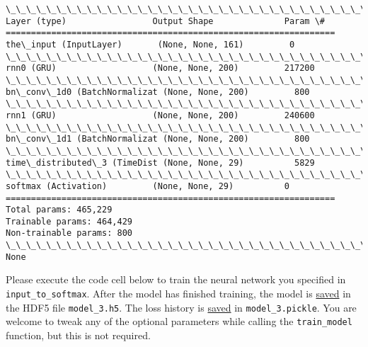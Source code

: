 \documentclass[11pt]{article}
\begin{document}
    \begin{Verbatim}[commandchars=\\\{\}]
\_\_\_\_\_\_\_\_\_\_\_\_\_\_\_\_\_\_\_\_\_\_\_\_\_\_\_\_\_\_\_\_\_\_\_\_\_\_\_\_\_\_\_\_\_\_\_\_\_\_\_\_\_\_\_\_\_\_\_\_\_\_\_\_\_
Layer (type)                 Output Shape              Param \#   
=================================================================
the\_input (InputLayer)       (None, None, 161)         0         
\_\_\_\_\_\_\_\_\_\_\_\_\_\_\_\_\_\_\_\_\_\_\_\_\_\_\_\_\_\_\_\_\_\_\_\_\_\_\_\_\_\_\_\_\_\_\_\_\_\_\_\_\_\_\_\_\_\_\_\_\_\_\_\_\_
rnn0 (GRU)                   (None, None, 200)         217200    
\_\_\_\_\_\_\_\_\_\_\_\_\_\_\_\_\_\_\_\_\_\_\_\_\_\_\_\_\_\_\_\_\_\_\_\_\_\_\_\_\_\_\_\_\_\_\_\_\_\_\_\_\_\_\_\_\_\_\_\_\_\_\_\_\_
bn\_conv\_1d0 (BatchNormalizat (None, None, 200)         800       
\_\_\_\_\_\_\_\_\_\_\_\_\_\_\_\_\_\_\_\_\_\_\_\_\_\_\_\_\_\_\_\_\_\_\_\_\_\_\_\_\_\_\_\_\_\_\_\_\_\_\_\_\_\_\_\_\_\_\_\_\_\_\_\_\_
rnn1 (GRU)                   (None, None, 200)         240600    
\_\_\_\_\_\_\_\_\_\_\_\_\_\_\_\_\_\_\_\_\_\_\_\_\_\_\_\_\_\_\_\_\_\_\_\_\_\_\_\_\_\_\_\_\_\_\_\_\_\_\_\_\_\_\_\_\_\_\_\_\_\_\_\_\_
bn\_conv\_1d1 (BatchNormalizat (None, None, 200)         800       
\_\_\_\_\_\_\_\_\_\_\_\_\_\_\_\_\_\_\_\_\_\_\_\_\_\_\_\_\_\_\_\_\_\_\_\_\_\_\_\_\_\_\_\_\_\_\_\_\_\_\_\_\_\_\_\_\_\_\_\_\_\_\_\_\_
time\_distributed\_3 (TimeDist (None, None, 29)          5829      
\_\_\_\_\_\_\_\_\_\_\_\_\_\_\_\_\_\_\_\_\_\_\_\_\_\_\_\_\_\_\_\_\_\_\_\_\_\_\_\_\_\_\_\_\_\_\_\_\_\_\_\_\_\_\_\_\_\_\_\_\_\_\_\_\_
softmax (Activation)         (None, None, 29)          0         
=================================================================
Total params: 465,229
Trainable params: 464,429
Non-trainable params: 800
\_\_\_\_\_\_\_\_\_\_\_\_\_\_\_\_\_\_\_\_\_\_\_\_\_\_\_\_\_\_\_\_\_\_\_\_\_\_\_\_\_\_\_\_\_\_\_\_\_\_\_\_\_\_\_\_\_\_\_\_\_\_\_\_\_
None

    \end{Verbatim}

    Please execute the code cell below to train the neural network you
specified in \texttt{input\_to\_softmax}. After the model has finished
training, the model is
\href{https://keras.io/getting-started/faq/\#how-can-i-save-a-keras-model}{saved}
in the HDF5 file \texttt{model\_3.h5}. The loss history is
\href{https://wiki.python.org/moin/UsingPickle}{saved} in
\texttt{model\_3.pickle}. You are welcome to tweak any of the optional
parameters while calling the \texttt{train\_model} function, but this is
not required.
\end{document}
